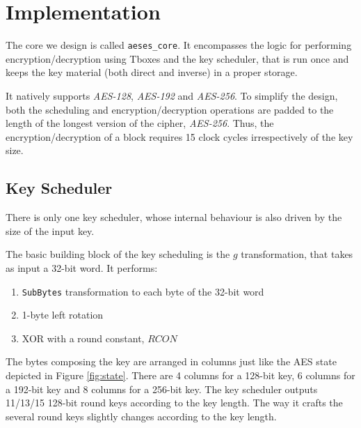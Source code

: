 \section{Implementation}

The core we design is called \texttt{aeses\_core}. It encompasses the logic
for performing encryption/decryption using Tboxes and the key scheduler, that is run
once and keeps the key material (both direct and inverse) in a proper storage.

It natively supports \textit{AES-128}, \textit{AES-192} and \textit{AES-256}.
To simplify the design, both the scheduling and encryption/decryption operations
are padded to the length of the longest version of the cipher, \textit{AES-256}.
Thus, the encryption/decryption of a block requires 15 clock cycles irrespectively of the
key size.

\subsection{Key Scheduler}

There is only one key scheduler, whose internal behaviour is also driven by the
size of the input key.

The basic building block of the key scheduling is the $g$ transformation, that
takes as input a 32-bit word.
It performs:
\begin{enumerate}
  \item \texttt{SubBytes} transformation to each byte of the 32-bit word
  \item 1-byte left rotation
  \item XOR with a round constant, $RCON$
\end{enumerate}
The bytes composing the key are arranged in columns just like the AES state depicted
in Figure \ref{fig:state}.
There are 4 columns for a 128-bit key, 6 columns for a 192-bit key and 8 columns
for a 256-bit key.
The key scheduler outputs 11/13/15 128-bit round keys according to the key length.
The way it crafts the several round keys slightly changes according to the key length.

